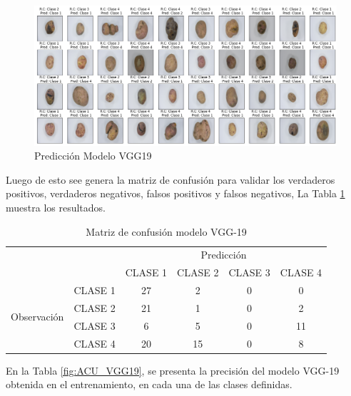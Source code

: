 			\begin{figure}[ht]
				\centering
				\includegraphics[scale=0.4]{Figs/103.png}
				\caption{Predicción Modelo VGG19}
				\label{fig:VGG19_prediccion}
			\end{figure}
		
			\newpage
			Luego de esto see genera la matriz de confusión para validar los verdaderos positivos, verdaderos negativos, falsos positivos y falsos negativos, La Tabla \ref{fig:MC_VGG19} muestra los resultados.
			
						
			\begin{table}[htbp]
				\centering
				\begin{tabular}{|c|l|c|c|c|c|}
					\hline
					\multicolumn{2}{|c|}{\multirow{2}[4]{*}{}} & \multicolumn{4}{c|}{Predicción} \bigstrut\\
					\cline{3-6}    \multicolumn{2}{|c|}{} & CLASE 1 & CLASE 2 & CLASE 3 & CLASE 4 \bigstrut\\
					\hline
					\multirow{4}[8]{*}{\begin{sideways}Observación\end{sideways}} & CLASE 1 & 27     & 2     & 0    & 0 \bigstrut\\
					\cline{2-6}     & CLASE 2 & 21     & 1     & 0    & 2 \bigstrut\\
					\cline{2-6}      & CLASE 3 & 6     & 5     & 0    & 11 \bigstrut\\
					\cline{2-6}     & CLASE 4 & 20     & 15     & 0    & 8 \bigstrut\\
					\hline
				\end{tabular}%
				\caption{Matriz de confusión modelo VGG-19}
				\label{fig:MC_VGG19}
			\end{table}%

			En la Tabla \ref{fig:ACU_VGG19}, se presenta la precisión del modelo VGG-19 obtenida en el entrenamiento, en cada una de las clases definidas.
			
